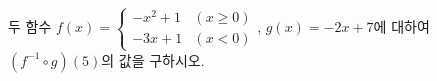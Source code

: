 두 함수 $f(x)=\begin{cases} -x^2+1 & (x\ge 0) \\ -3x+1 & (x<0) \end{cases}$, $g(x)=-2x+7$에 대하여 $(f^{-1}\circ g)(5)$의 값을 구하시오.
